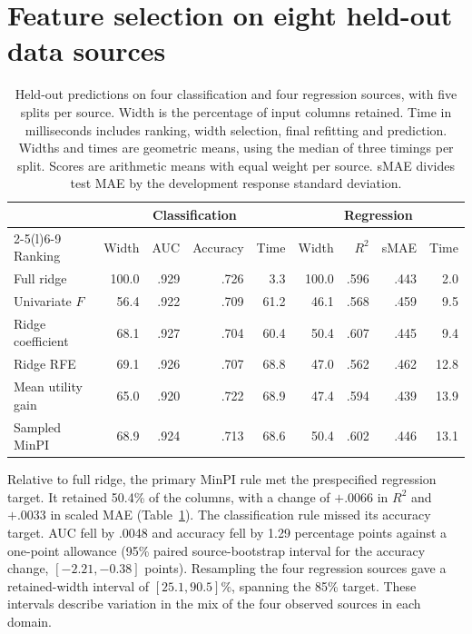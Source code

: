 \section{Feature selection on eight held-out data sources}
\label{sec:minpi-compression}

\begin{table}[t]
\centering
\caption{Held-out predictions on four classification and four regression sources,
with five splits per source. Width is the percentage of input columns retained.
Time in milliseconds includes ranking, width selection, final refitting and
prediction. Widths and times are geometric means, using the median of three
timings per split. Scores are arithmetic means with equal weight per source.
sMAE divides test MAE by the development response standard deviation.}
\label{tab:minpi-compression}
\small
\setlength{\tabcolsep}{4pt}
\begin{tabular}{@{}lrrrrrrrr@{}}
\toprule
& \multicolumn{4}{c}{Classification} & \multicolumn{4}{c}{Regression} \\
\cmidrule(lr){2-5}\cmidrule(l){6-9}
Ranking & Width & AUC & Accuracy & Time & Width & $R^2$ & sMAE & Time \\
\midrule
Full ridge       & 100.0 & .929 & .726 &  3.3 & 100.0 & .596 & .443 &  2.0 \\
Univariate $F$   &  56.4 & .922 & .709 & 61.2 &  46.1 & .568 & .459 &  9.5 \\
Ridge coefficient&  68.1 & .927 & .704 & 60.4 &  50.4 & .607 & .445 &  9.4 \\
Ridge RFE        &  69.1 & .926 & .707 & 68.8 &  47.0 & .562 & .462 & 12.8 \\
Mean utility gain&  65.0 & .920 & .722 & 68.9 &  47.4 & .594 & .439 & 13.9 \\
Sampled MinPI    &  68.9 & .924 & .713 & 68.6 &  50.4 & .602 & .446 & 13.1 \\
\bottomrule
\end{tabular}
\end{table}

Relative to full ridge, the primary MinPI rule met the prespecified regression
target. It retained 50.4\% of the columns, with a change of \(+.0066\) in
\(R^2\) and \(+.0033\) in scaled MAE (Table~\ref{tab:minpi-compression}).
The classification rule missed its accuracy target. AUC fell by .0048 and
accuracy fell by 1.29 percentage points against a one-point allowance
(95\% paired source-bootstrap interval for the accuracy change, \([-2.21,-0.38]\)
points). Resampling the four regression sources gave a retained-width interval
of \([25.1,90.5]\%\), spanning the 85\% target. These intervals describe
variation in the mix of the four observed sources in each domain.

